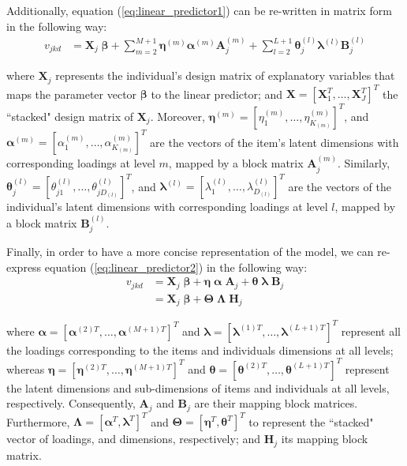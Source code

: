 Additionally, equation (\ref{eq:linear_predictor1}) can be re-written in matrix form in the following way:
%
\begin{equation} \label{eq:linear_predictor2}
	\begin{split}
		v_{jkd} &= \mathbf{X}_{j} \; \pmb{\beta} + \sum_{m=2}^{M+1} \pmb{\eta}^{(m)} \pmb{\alpha}^{(m)} \mathbf{A}_{j}^{(m)} + \sum_{l=2}^{L+1} \pmb{\theta}_{j}^{(l)} \pmb{\lambda}^{(l)} \mathbf{B}_{j}^{(l)}
	\end{split}
\end{equation}

\noindent where $\mathbf{X}_{j}$ represents the individual's design matrix of explanatory variables that maps the parameter vector $\pmb{\beta}$ to the linear predictor; and $\mathbf{X} = [ \mathbf{X}_{1}^{T}, \dots, \mathbf{X}_{J}^{T} ]^{T}$ the ``stacked" design matrix of $\mathbf{X}_{j}$. Moreover, $\pmb{\eta}^{(m)} = [ \eta_{1}^{(m)}, \dots, \eta_{K_{(m)}}^{(m)} ]^{T}$, and  $\pmb{\alpha}^{(m)} = [ \alpha_{1}^{(m)}, \dots, \alpha_{K_{(m)}}^{(m)} ]^{T}$ are the vectors of the item's latent dimensions with corresponding loadings at level $m$, mapped by a block matrix $\mathbf{A}_{j}^{(m)}$. Similarly, $\pmb{\theta}_{j}^{(l)} = [ \theta_{j1}^{(l)}, \dots, \theta_{jD_{(l)}}^{(l)} ]^{T}$, and  $\pmb{\lambda}^{(l)} = [ \lambda_{1}^{(l)}, \dots, \lambda_{D_{(l)}}^{(l)} ]^{T}$ are the vectors of the individual's latent dimensions with corresponding loadings at level $l$, mapped by a block matrix $\mathbf{B}_{j}^{(l)}$.

Finally, in order to have a more concise representation of the model, we can re-express equation (\ref{eq:linear_predictor2}) in the following way:
%
\begin{equation} \label{eq:linear_predictor3}
	\begin{split}
		v_{jkd} &= \mathbf{X}_{j} \; \pmb{\beta} + \pmb{\eta} \; \pmb{\alpha} \; \mathbf{A}_{j} + \pmb{\theta} \; \pmb{\lambda} \; \mathbf{B}_{j} \\
		&= \mathbf{X}_{j} \; \pmb{\beta} + \pmb{\Theta} \; \pmb{\Lambda} \; \mathbf{H}_{j}
	\end{split}
\end{equation}

\noindent where $\pmb{\alpha} = [ \pmb{\alpha}^{(2)T}, \dots, \pmb{\alpha}^{(M+1)T} ]^{T}$ and $\pmb{\lambda} = [ \pmb{\lambda}^{(1)T}, \dots, \pmb{\lambda}^{(L+1)T} ]^{T}$ represent all the loadings corresponding to the items and individuals dimensions at all levels; whereas $\pmb{\eta} = [ \pmb{\eta}^{(2)T}, \dots, \pmb{\eta}^{(M+1)T} ]^{T}$ and $\pmb{\theta} = [ \pmb{\theta}^{(2)T}, \dots, \pmb{\theta}^{(L+1)T} ]^{T}$ represent the latent dimensions and sub-dimensions of items and individuals at all levels, respectively. Consequently, $\mathbf{A}_{j}$ and $\mathbf{B}_{j}$ are their mapping block matrices. Furthermore, $\pmb{\Lambda} = [ \pmb{\alpha}^{T}, \pmb{\lambda}^{T} ]^{T}$ and $\pmb{\Theta} = [ \pmb{\eta}^{T}, \pmb{\theta}^{T} ]^{T}$ to represent the ``stacked" vector of loadings, and dimensions, respectively; and $\mathbf{H}_{j}$ its mapping block matrix.

